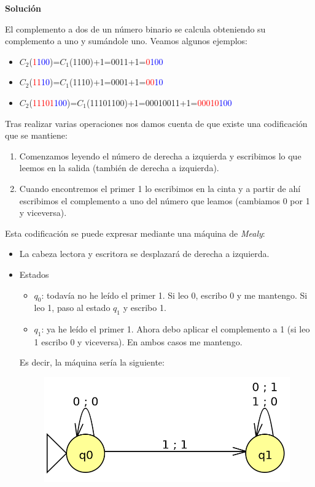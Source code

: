 \documentclass[12pt,spanish]{article}
\newenvironment{solution}{
	\par
	\textbf{Solución}
	\par
	\begin{center}
}
{
	\end{center}
}
\begin{document}
\begin{enumerate}
	\begin{solution}
	El complemento a dos de un número binario se calcula obteniendo su complemento a uno y sumándole uno. Veamos algunos ejemplos:
	\begin{itemize}
		\item $C_2$(\textcolor{red}{1}\textcolor{blue}{100})=$C_1$(1100)+1=0011+1=\textcolor{red}{0}\textcolor{blue}{100}
		\item $C_2$(\textcolor{red}{11}\textcolor{blue}{10})=$C_1$(1110)+1=0001+1=\textcolor{red}{00}\textcolor{blue}{10}
		\item $C_2$(\textcolor{red}{11101}\textcolor{blue}{100})=$C_1$(11101100)+1=00010011+1=\textcolor{red}{00010}\textcolor{blue}{100}
	\end{itemize}
	Tras realizar varias operaciones nos damos cuenta de que existe una codificación que se mantiene:
	\begin{enumerate}
		\item Comenzamos leyendo el número de derecha a izquierda y escribimos lo que leemos en la salida (también de derecha a izquierda).
		\item Cuando encontremos el primer 1 lo escribimos en la cinta y a partir de ahí escribimos el complemento a uno del número que leamos (cambiamos 0 por 1 y viceversa).
	\end{enumerate}
	\newpage
	Esta codificación se puede expresar mediante una máquina de \textit{Mealy}:
	\begin{itemize}
		\item La cabeza lectora y escritora se desplazará de derecha a izquierda.
		\item Estados
			\begin{itemize}
				\item $q_0$: todavía no he leído el primer 1. Si leo 0, escribo 0 y me mantengo. Si leo 1, paso al estado $q_1$ y escribo 1.
				\item $q_1$: ya he leído el primer 1. Ahora debo aplicar el complemento a 1 (si leo 1 escribo 0 y viceversa). En ambos casos me mantengo.
			\end{itemize}
		Es decir, la máquina sería la siguiente:
			\begin{figure}[H]
				\centering
				\includegraphics{ej2.png}
			\end{figure}
	\end{itemize}

	\end{solution}
\end{enumerate}
\end{document}
